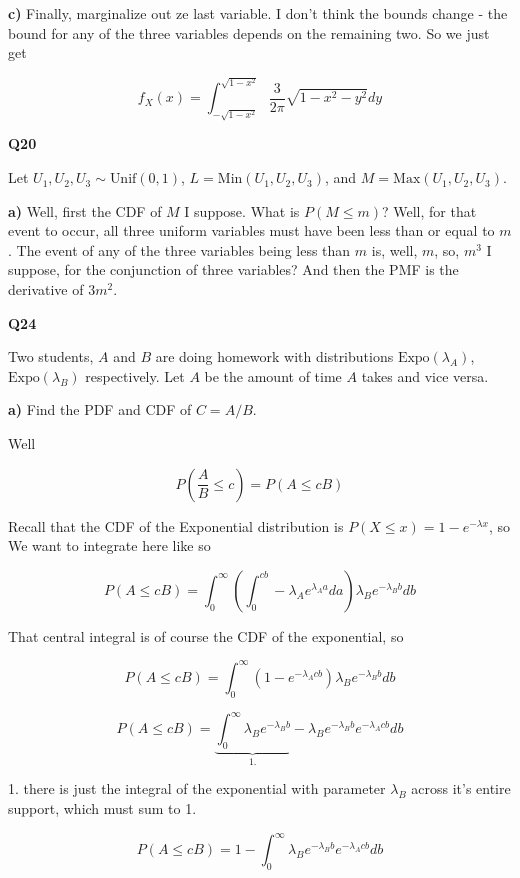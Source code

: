 \documentclass{article}
\begin{document}
			\textbf{c)} Finally, marginalize out ze last variable. I don't think the bounds change - the bound for any of the three variables depends on the remaining two. So we just get 
			
			\[ f_{X}(x) = \int^{\sqrt{1-x^2}}_{-\sqrt{1-x^2}} \frac{3}{2\pi}\sqrt{1-x^2-y^2} dy \]
			
			\hfill
			
		\textbf{Q20}
				
			Let $U_1, U_2, U_3\sim \text{Unif}(0, 1)$, $L = \text{Min}(U_1, U_2, U_3)$, and $M = \text{Max}(U_1, U_2, U_3)$.
			
			\textbf{a)} Well, first the CDF of $M$ I suppose. What is $P(M\le m)$? Well, for that event to occur, all three uniform variables must have been less than or equal to $m$. The event of any of the three variables being less than $m$ is, well, $m$, so, $m^3$ I suppose, for the conjunction of three variables? And then the PMF is the derivative of $3m^2$.
		
			\hfill
			
		\textbf{Q24} 
		
			Two students, $A$ and $B$ are doing homework with distributions $\text{Expo}(\lambda_A)$,  $\text{Expo}(\lambda_B)$ respectively. Let $A$ be the amount of time $A$ takes and vice versa.
			
			\textbf{a)} Find the PDF and CDF of $C = A/B$. 
			
			Well
			
			\[ P(\frac{A}{B}\le c) = P(A\le cB) \]
		
			Recall that the CDF of the Exponential distribution is $P(X\le x) = 1-e^{-\lambda x}$, so We want to integrate here like so
			
			\[ P(A\le cB) = \int^\infty_0 \left(\int^{cb}_0 -\lambda_Ae^{\lambda_A a} da\right) \lambda_Be^{-\lambda_B b} db \]
			
			That central integral is of course the CDF of the exponential, so
			
			\[ P(A\le cB) = \int^\infty_0 (1-e^{-\lambda_Acb}) \lambda_Be^{-\lambda_B b} db \]
			
			\[ P(A\le cB) = \underbrace{\int^\infty_0 \lambda_Be^{-\lambda_B b}}_{1.} - \lambda_Be^{-\lambda_B b}e^{-\lambda_Acb} db \]
			
			1. there is just the integral of the exponential with parameter $\lambda_B$ across it's entire support, which must sum to 1.
			
			\[ P(A\le cB) = 1 - \int^\infty_0\lambda_Be^{-\lambda_B b}e^{-\lambda_Acb} db \]
			
\end{document}
